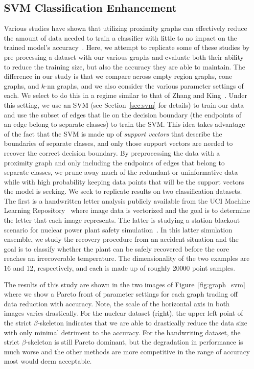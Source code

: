 \subsection{SVM Classification Enhancement}

Various studies have shown that utilizing proximity graphs can effectively reduce the amount of data needed to train a classifier with little to no impact on the trained model's accuracy~\cite{BhattacharyaPoulsenToussaint1981,GotoIshidaUchida2015,Toussaint2005,ToussaintBerzan2012,ZhangKing2002a,ZhangKing2002b}.
%
Here, we attempt to replicate some of these studies by pre-processing a dataset with our various graphs and evaluate both their ability to reduce the training size, but also the accuracy they are able to maintain.
%
The difference in our study is that we compare across empty region graphs, cone graphs, and $k$-nn graphs, and we also consider the various parameter settings of each.
%
We select to do this in a regime similar to that of Zhang and King~\cite{ZhangKing2002a,ZhangKing2002b}.
%
Under this setting, we use an SVM (see Section~\ref{sec:svm} for details) to train our data and use the subset of edges that lie on the decision boundary (the endpoints of an edge belong to separate classes) to train the SVM.
%
This idea takes advantage of the fact that the SVM is made up of \textit{support vectors} that describe the boundaries of separate classes, and only those support vectors are needed to recover the correct decision boundary.
%
By preprocessing the data with a proximity graph and only including the endpoints of edges that belong to separate classes, we prune away much of the redundant or uninformative data while with high probability keeping data points that will be the support vectors the model is seeking.
%
We seek to replicate results on two classification datasets.
%
The first is a handwritten letter analysis publicly available from the UCI Machine Learning Repository~\cite{DuaGraff2017} where image data is vectorized and the goal is to determine the letter that each image represents.
%
The latter is studying a station blackout scenario for nuclear power plant safety simulation~\cite{MaljovecLiuWang2015}.
%
In this latter simulation ensemble, we study the recovery procedure from an accident situation and the goal is to classify whether the plant can be safely recovered before the core reaches an irrecoverable temperature.
%
The dimensionality of the two examples are 16 and 12, respectively, and each is made up of roughly 20000 point samples.

The results of this study are shown in the two images of Figure~\ref{fig:graph_svm} where we show a Pareto front of parameter settings for each graph trading off data reduction with accuracy.
%
Note, the scale of the horizontal axis in both images varies drastically.
%
For the nuclear dataset (right), the upper left point of the strict $\beta$-skeleton indicates that we are able to drastically reduce the data size with only minimal detriment to the accuracy.
%
For the handwriting dataset, the strict $\beta$-skeleton is still Pareto dominant, but the degradation in performance is much worse and the other methods are more competitive in the range of accuracy most would deem acceptable.

